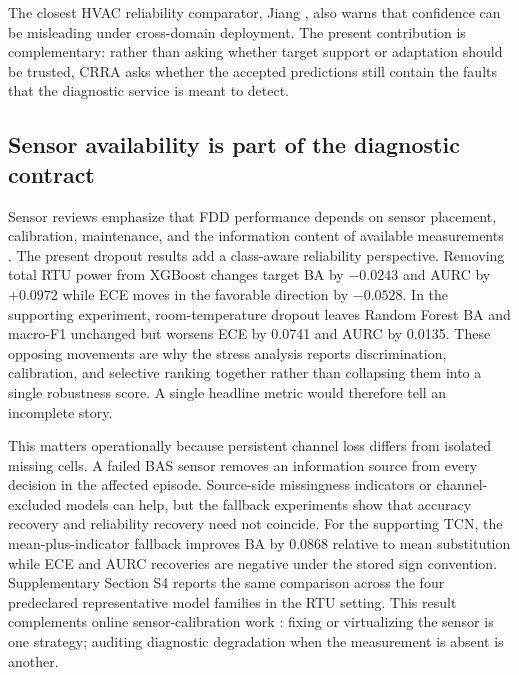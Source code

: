 \documentclass[preprint,12pt]{elsarticle}
\begin{document}
The closest HVAC reliability comparator, Jiang \cite{jiang2026leakage}, also warns that confidence can be misleading under cross-domain deployment. The present contribution is complementary: rather than asking whether target support or adaptation should be trusted, CRRA asks whether the accepted predictions still contain the faults that the diagnostic service is meant to detect.

\subsection{Sensor availability is part of the diagnostic contract}
Sensor reviews emphasize that FDD performance depends on sensor placement, calibration, maintenance, and the information content of available measurements \cite{zhang2021sensor,hu2025sensorreview}. The present dropout results add a class-aware reliability perspective. Removing total RTU power from XGBoost changes target BA by $-0.0243$ and AURC by $+0.0972$ while ECE moves in the favorable direction by $-0.0528$. In the supporting experiment, room-temperature dropout leaves Random Forest BA and macro-F1 unchanged but worsens ECE by 0.0741 and AURC by 0.0135. These opposing movements are why the stress analysis reports discrimination, calibration, and selective ranking together rather than collapsing them into a single robustness score. A single headline metric would therefore tell an incomplete story.

This matters operationally because persistent channel loss differs from isolated missing cells. A failed BAS sensor removes an information source from every decision in the affected episode. Source-side missingness indicators or channel-excluded models can help, but the fallback experiments show that accuracy recovery and reliability recovery need not coincide. For the supporting TCN, the mean-plus-indicator fallback improves BA by 0.0868 relative to mean substitution while ECE and AURC recoveries are negative under the stored sign convention. Supplementary Section S4 reports the same comparison across the four predeclared representative model families in the RTU setting. This result complements online sensor-calibration work \cite{li2025voting}: fixing or virtualizing the sensor is one strategy; auditing diagnostic degradation when the measurement is absent is another.
\end{document}
